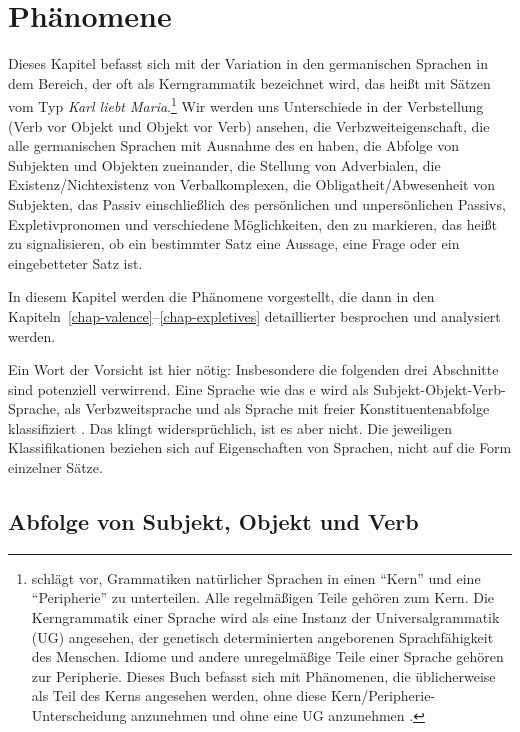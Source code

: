 
\settowidth{}

\chapter{Phänomene}

Dieses Kapitel befasst sich mit der Variation in den germanischen Sprachen in dem Bereich, der oft als Kerngrammatik
bezeichnet wird, das heißt mit Sätzen vom Typ \emph{Karl liebt Maria}.\footnote{%
  \citet[--8]{Chomsky81a} schlägt vor, Grammatiken natürlicher Sprachen in einen "`Kern"' und eine "`Peripherie"' zu unterteilen.
Alle regelmäßigen Teile gehören zum Kern. Die Kerngrammatik einer Sprache wird als eine Instanz der
Universalgrammatik (UG) angesehen, der genetisch determinierten angeborenen Sprachfähigkeit des Menschen. Idiome
und andere unregelmäßige Teile einer Sprache gehören zur Peripherie. Dieses Buch befasst sich mit Phänomenen,
die üblicherweise als Teil des Kerns angesehen werden, ohne diese Kern/Peripherie-Unterscheidung anzunehmen und ohne
eine UG anzunehmen \citep{MuellerKernigkeit,MuellerCoreGram}.
} Wir werden uns Unterschiede in
der Verbstellung (Verb vor Objekt und Objekt vor Verb) ansehen, die Verbzweiteigenschaft, die
alle germanischen Sprachen mit Ausnahme des en haben, die Abfolge von Subjekten und
Objekten zueinander, die Stellung von Adverbialen, die Existenz/Nichtexistenz von
Verbalkomplexen, die Obligatheit/Abwesenheit von Subjekten, das Passiv einschließlich des persönlichen und
unpersönlichen Passivs, Expletivpronomen und verschiedene Möglichkeiten, den  zu markieren, das heißt
zu signalisieren, ob ein bestimmter Satz eine Aussage, eine Frage oder ein eingebetteter Satz ist.

In diesem Kapitel werden die Phänomene vorgestellt, die dann in den
Kapiteln~\ref{chap-valence}--\ref{chap-expletives} detaillierter besprochen und analysiert werden.

Ein Wort der Vorsicht ist hier nötig: Insbesondere die folgenden drei Abschnitte sind potenziell
verwirrend. Eine Sprache wie das e wird als Subjekt-Objekt-Verb-Sprache, als Verbzweitsprache und
als Sprache mit freier Konstituentenabfolge klassifiziert \citep{Haftka96a}. Das klingt widersprüchlich, ist es aber nicht. Die jeweiligen
Klassifikationen beziehen sich auf Eigenschaften von Sprachen, nicht auf die Form einzelner Sätze.

\section{Abfolge von Subjekt, Objekt und Verb}
\label{sec-intro-svo}

